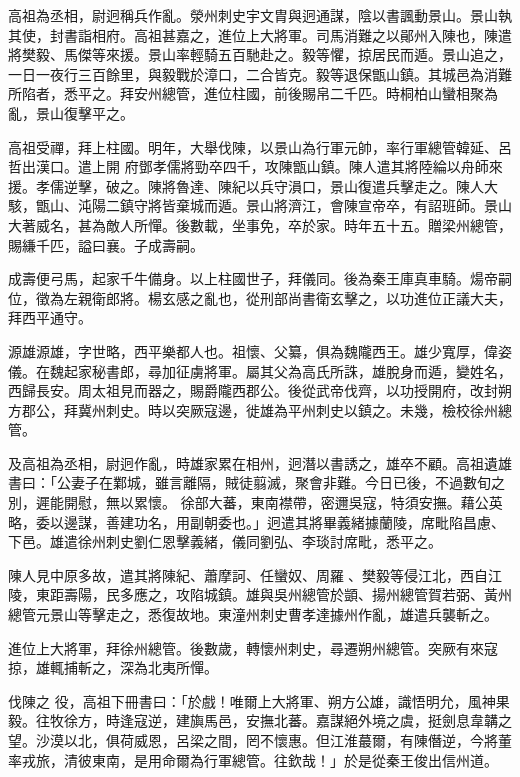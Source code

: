 \begin{pinyinscope}
 高祖為丞相，尉迥稱兵作亂。滎州刺史宇文胄與迥通謀，陰以書諷動景山。景山執其使，封書詣相府。高祖甚嘉之，進位上大將軍。司馬消難之以鄖州入陳也，陳遣將樊毅、馬傑等來援。景山率輕騎五百馳赴之。毅等懼，掠居民而遁。景山追之，一日一夜行三百餘里，與毅戰於漳口，二合皆克。毅等退保甑山鎮。其城邑為消難所陷者，悉平之。拜安州總管，進位柱國，前後賜帛二千匹。時桐柏山蠻相聚為亂，景山復擊平之。



 高祖受禪，拜上柱國。明年，大舉伐陳，以景山為行軍元帥，率行軍總管韓延、呂哲出漢口。遣上開
 府鄧孝儒將勁卒四千，攻陳甑山鎮。陳人遣其將陸綸以舟師來援。孝儒逆擊，破之。陳將魯達、陳紀以兵守溳口，景山復遣兵擊走之。陳人大駭，甑山、沌陽二鎮守將皆棄城而遁。景山將濟江，會陳宣帝卒，有詔班師。景山大著威名，甚為敵人所憚。後數載，坐事免，卒於家。時年五十五。贈梁州總管，賜縑千匹，謚曰襄。子成壽嗣。



 成壽便弓馬，起家千牛備身。以上柱國世子，拜儀同。後為秦王庫真車騎。煬帝嗣位，徵為左親衛郎將。楊玄感之亂也，從刑部尚書衛玄擊之，以功進位正議大夫，拜西平通守。



 源雄源雄，字世略，西平樂都人也。祖懷、父纂，俱為魏隴西王。雄少寬厚，偉姿儀。在魏起家秘書郎，尋加征虜將軍。屬其父為高氏所誅，雄脫身而遁，變姓名，西歸長安。周太祖見而器之，賜爵隴西郡公。後從武帝伐齊，以功授開府，改封朔方郡公，拜冀州刺史。時以突厥寇邊，徙雄為平州刺史以鎮之。未幾，檢校徐州總管。



 及高祖為丞相，尉迥作亂，時雄家累在相州，迥潛以書誘之，雄卒不顧。高祖遺雄書曰：「公妻子在鄴城，雖言離隔，賊徒翦滅，聚會非難。今日已後，不過數旬之別，遲能開慰，無以累懷。
 徐部大蕃，東南襟帶，密邇吳寇，特須安撫。藉公英略，委以邊謀，善建功名，用副朝委也。」迥遣其將畢義緒據蘭陵，席毗陷昌慮、下邑。雄遣徐州刺史劉仁恩擊義緒，儀同劉弘、李琰討席毗，悉平之。



 陳人見中原多故，遣其將陳紀、蕭摩訶、任蠻奴、周羅、樊毅等侵江北，西自江陵，東距壽陽，民多應之，攻陷城鎮。雄與吳州總管於顗、揚州總管賀若弼、黃州總管元景山等擊走之，悉復故地。東潼州刺史曹孝達據州作亂，雄遣兵襲斬之。



 進位上大將軍，拜徐州總管。後數歲，轉懷州刺史，尋遷朔州總管。突厥有來寇掠，雄輒捕斬之，深為北夷所憚。



 伐陳之
 役，高祖下冊書曰：「於戲！唯爾上大將軍、朔方公雄，識悟明允，風神果毅。往牧徐方，時逢寇逆，建旟馬邑，安撫北蕃。嘉謀絕外境之虞，挺劍息韋韝之望。沙漠以北，俱荷威恩，呂梁之間，罔不懷惠。但江淮蕞爾，有陳僭逆，今將董率戎旅，清彼東南，是用命爾為行軍總管。往欽哉！」於是從秦王俊出信州道。




\end{pinyinscope}
